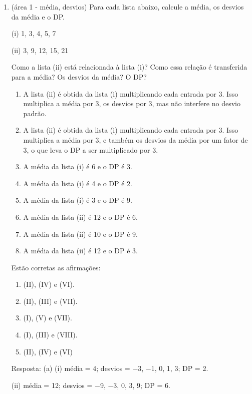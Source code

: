 \documentclass[12pt]{article}\documentclass[brazilian,12pt,a4paper,final]{article}
\begin{document}
\begin{enumerate}
\item (área 1 - média, desvios) Para cada lista abaixo, calcule a média, os desvios da média e o DP.

(i) 1, 3, 4, 5, 7

(ii) 3, 9, 12, 15, 21

Como a lista (ii) está relacionada à lista (i)? Como essa relação é transferida para a
média? Os desvios da média? O DP?

\begin{enumerate}[label=(\Roman*)]

\item A lista (ii) é obtida da lista (i) multiplicando cada entrada por 3. Isso multiplica a média por 3, os desvios por 3, mas não interfere no desvio padrão.

\item A lista (ii) é obtida da lista (i) multiplicando cada entrada por 3. Isso multiplica a média por 3, e também os desvios da média por um
fator de 3, o que leva o DP a ser multiplicado por 3.

\item A média da lista (i) é 6 e o DP é 3.

\item A média da lista (i) é 4 e o DP é 2.

\item A média da lista (i) é 3 e o DP é 9.

\item A média da lista (ii) é 12 e o DP é 6.

\item A média da lista (ii) é 10 e o DP é 9.

\item A média da lista (ii) é 12 e o DP é 3.
\end{enumerate}

Estão corretas as afirmações:

\begin{enumerate}
    \item (II), (IV) e (VI).
    \item (II), (III) e (VII).
    \item (I), (V) e (VII). 
    \item (I), (III) e (VIII).
    \item (II), (IV) e (VI)
\end{enumerate}

Resposta:
(a)
(i) média = 4; desvios = −3, −1, 0, 1, 3; DP = 2.

(ii) média = 12; desvios = −9, −3, 0, 3, 9; DP = 6.


\end{enumerate}
\end{document}

